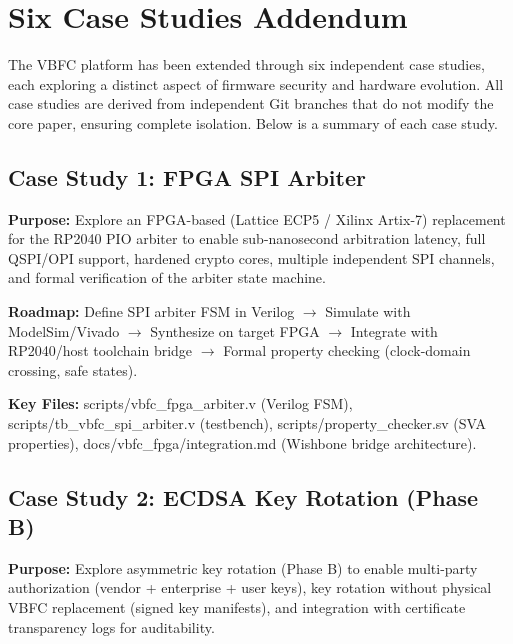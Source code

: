 \documentclass[11pt,a4paper,oneside]{article}
\begin{document}
\printbibliography[heading=bibintoc,title={References}]

\begin{appendices}





\end{appendices}

\newpage
\section*{Six Case Studies Addendum}

The VBFC platform has been extended through six independent case studies, each exploring a distinct aspect of firmware security and hardware evolution. All case studies are derived from independent Git branches that do not modify the core paper, ensuring complete isolation. Below is a summary of each case study.

\subsection{Case Study 1: FPGA SPI Arbiter}
\textbf{Purpose:} Explore an FPGA-based (Lattice ECP5 / Xilinx Artix-7) replacement for the RP2040 PIO arbiter to enable sub-nanosecond arbitration latency, full QSPI/OPI support, hardened crypto cores, multiple independent SPI channels, and formal verification of the arbiter state machine.

\textbf{Roadmap:} Define SPI arbiter FSM in Verilog $\rightarrow$ Simulate with ModelSim/Vivado $\rightarrow$ Synthesize on target FPGA $\rightarrow$ Integrate with RP2040/host toolchain bridge $\rightarrow$ Formal property checking (clock-domain crossing, safe states).

\textbf{Key Files:} scripts/vbfc_fpga_arbiter.v (Verilog FSM), scripts/tb_vbfc_spi_arbiter.v (testbench), scripts/property_checker.sv (SVA properties), docs/vbfc_fpga/integration.md (Wishbone bridge architecture).

\subsection{Case Study 2: ECDSA Key Rotation (Phase B)}
\textbf{Purpose:} Explore asymmetric key rotation (Phase B) to enable multi-party authorization (vendor + enterprise + user keys), key rotation without physical VBFC replacement (signed key manifests), and integration with certificate transparency logs for auditability.
\end{document}
